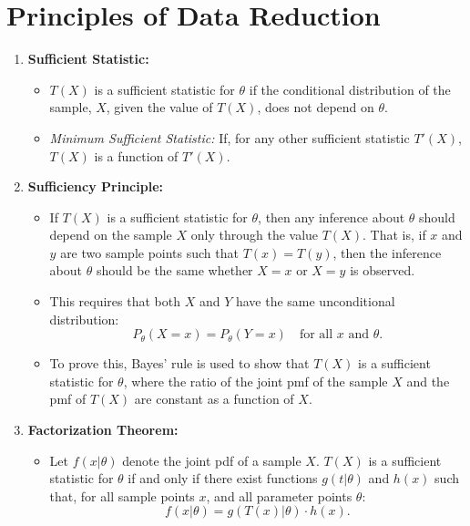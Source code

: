\documentclass{article}
\begin{document}
\section{Principles of Data Reduction}

\begin{enumerate}
    \item \textbf{Sufficient Statistic:}
    \begin{itemize}
        \item \(T(X)\) is a sufficient statistic for \(\theta\) if the conditional distribution of the sample, \(X\), given the value of \(T(X)\), does not depend on \(\theta\).
        \item \textit{Minimum Sufficient Statistic:} If, for any other sufficient statistic \(T'(X)\), \(T(X)\) is a function of \(T'(X)\).
    \end{itemize}

    \item \textbf{Sufficiency Principle:}
    \begin{itemize}
        \item If \(T(X)\) is a sufficient statistic for \(\theta\), then any inference about \(\theta\) should depend on the sample \(X\) only through the value \(T(X)\). That is, if \(x\) and \(y\) are two sample points such that \(T(x) = T(y)\), then the inference about \(\theta\) should be the same whether \(X = x\) or \(X = y\) is observed.
        \item This requires that both \(X\) and \(Y\) have the same unconditional distribution:
        \[
        P_\theta(X = x) = P_\theta(Y = x) \quad \text{for all } x \text{ and } \theta.
        \]
        \item To prove this, Bayes' rule is used to show that \(T(X)\) is a sufficient statistic for \(\theta\), where the ratio of the joint pmf of the sample \(X\) and the pmf of \(T(X)\) are constant as a function of \(X\).
    \end{itemize}

    \item \textbf{Factorization Theorem:}
    \begin{itemize}
        \item Let \(f(x|\theta)\) denote the joint pdf of a sample \(X\). \(T(X)\) is a sufficient statistic for \(\theta\) if and only if there exist functions \(g(t|\theta)\) and \(h(x)\) such that, for all sample points \(x\), and all parameter points \(\theta\):
        \[
        f(x|\theta) = g(T(x)|\theta) \cdot h(x).
        \]
    \end{itemize}


\end{enumerate}
\end{document}
